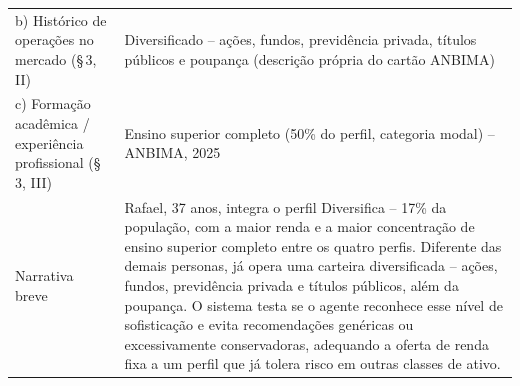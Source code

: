 \begin{quadro}[htbp]
\begin{tabular}{p{5cm}p{8cm}}
    \quad b) Hist\'orico de opera\c{c}\~oes no mercado (\S\,3\textordmasculine{}, II) & Diversificado -- a\c{c}\~oes, fundos, previd\^encia privada, t\'itulos p\'ublicos e poupan\c{c}a (descri\c{c}\~ao pr\'opria do cart\~ao ANBIMA) \\
    \quad c) Forma\c{c}\~ao acad\^emica / experi\^encia profissional (\S\,3\textordmasculine{}, III) & Ensino superior completo (50\% do perfil, categoria modal) -- ANBIMA, 2025 \\
    Narrativa breve & Rafael, 37 anos, integra o perfil Diversifica -- 17\% da popula\c{c}\~ao, com a maior renda e a maior concentra\c{c}\~ao de ensino superior completo entre os quatro perfis. Diferente das demais personas, j\'a opera uma carteira diversificada -- a\c{c}\~oes, fundos, previd\^encia privada e t\'itulos p\'ublicos, al\'em da poupan\c{c}a. O sistema testa se o agente reconhece esse n\'ivel de sofistica\c{c}\~ao e evita recomenda\c{c}\~oes gen\'ericas ou excessivamente conservadoras, adequando a oferta de renda fixa a um perfil que j\'a tolera risco em outras classes de ativo. \\
    \bottomrule
  \end{tabular}
\end{quadro}

